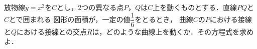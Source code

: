 \documentclass[../../main.tex]{subfiles}
\begin{document}
放物線$y=x^2$を$C$とし，2つの異なる点$P$，$Q$は$C$上を動くものとする．直線$PQ$と$C$とで囲まれる
図形の面積が，一定の値$\displaystyle\dfrac{1}{6}$をとるとき，
曲線$C$の$P$における接線と$Q$における接線との交点$R$は，どのような曲線上を動くか．その方程式を求めよ．
\end{document}
